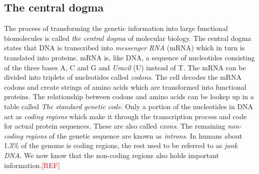 \documentclass[thesis.tex]{subfiles}
\begin{document}
\subsection{The central dogma}
The process of transforming the genetic information into large functional biomolecules is called \textit{the central dogma} of molecular biology. The central dogma states that DNA is transcribed into \textit{messenger RNA} (mRNA) which in turn is translated into proteins. mRNA is, like DNA, a sequence of nucleotides consisting of the three bases A, C and G and \textit{Uracil} (U) instead of T. The mRNA can be divided into triplets of nucleotides called \textit{codons}. The cell decodes the mRNA codons and create strings of amino acids which are transformed into functional proteins. The relationship between codons and amino acids can be lookep up in a table called \textit{The standard genetic code}\cite[Chapter 1, p. 6]{introduction_to_genomics}. Only a portion of the nucleotides in DNA act as \textit{coding regions} which make it through the transcription process and code for actual protein sequences. These are also called \textit{exons}. The remaining \textit{non-coding regions} of the genetic sequence are known as \textit{introns}. In humans about 1.3\% of the genome is coding regions\cite[Chapter 4]{introduction_to_genomics}, the rest used to be referred to as \textit{junk DNA}. We now know that the non-coding regions also holds important information.\textcolor{red}{[REF]}
\end{document}
